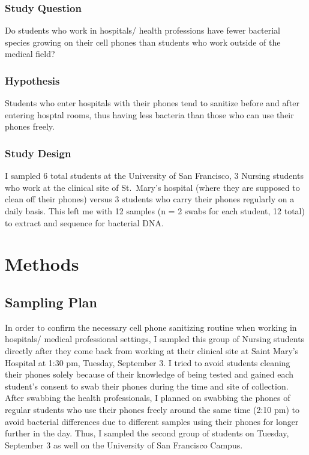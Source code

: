 \documentclass[]{article}
\begin{document}
\hypertarget{study-question}{%
\subsubsection{Study Question}\label{study-question}}

Do students who work in hospitals/ health professions have fewer
bacterial species growing on their cell phones than students who work
outside of the medical field?

\hypertarget{hypothesis}{%
\subsubsection{Hypothesis}\label{hypothesis}}

Students who enter hospitals with their phones tend to sanitize before
and after entering hosptal rooms, thus having less bacteria than those
who can use their phones freely.

\hypertarget{study-design}{%
\subsubsection{Study Design}\label{study-design}}

I sampled 6 total students at the University of San Francisco, 3 Nursing
students who work at the clinical site of St.~Mary's hospital (where
they are supposed to clean off their phones) versus 3 students who carry
their phones regularly on a daily basis. This left me with 12 samples (n
= 2 swabs for each student, 12 total) to extract and sequence for
bacterial DNA.

\hypertarget{methods}{%
\section{Methods}\label{methods}}

\hypertarget{sampling-plan}{%
\subsection{Sampling Plan}\label{sampling-plan}}

In order to confirm the necessary cell phone sanitizing routine when
working in hospitals/ medical professional settings, I sampled this
group of Nursing students directly after they come back from working at
their clinical site at Saint Mary's Hospital at 1:30 pm, Tuesday,
September 3. I tried to avoid students cleaning their phones solely
because of their knowledge of being tested and gained each student's
consent to swab their phones during the time and site of collection.
After swabbing the health professionals, I planned on swabbing the
phones of regular students who use their phones freely around the same
time (2:10 pm) to avoid bacterial differences due to different samples
using their phones for longer further in the day. Thus, I sampled the
second group of students on Tuesday, September 3 as well on the
University of San Francisco Campus.
\end{document}
